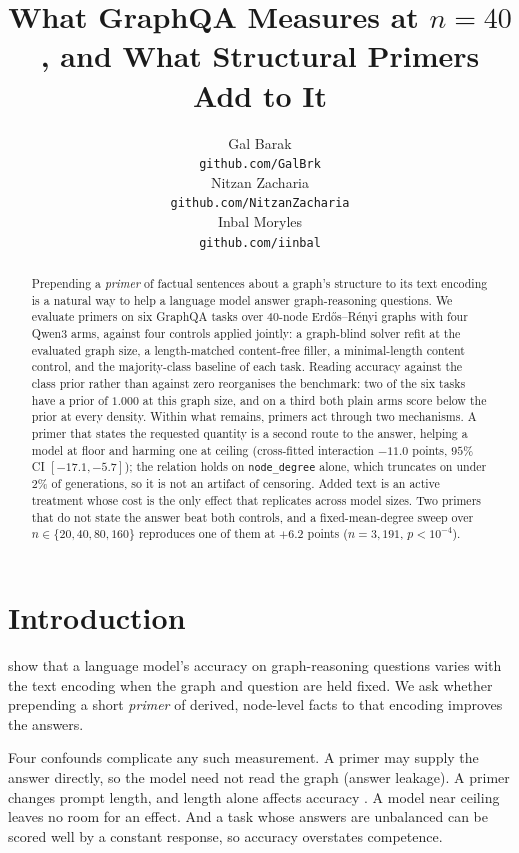 \documentclass[11pt]{article}
\title{What GraphQA Measures at $n{=}40$, and What Structural Primers
Add to It}
\author{
  Gal Barak \\
  \footnotesize\texttt{github.com/GalBrk} \\\And
  Nitzan Zacharia \\
  \footnotesize\texttt{github.com/NitzanZacharia} \\\And
  Inbal Moryles \\
  \footnotesize\texttt{github.com/iinbal} \\
}
\begin{document}
\maketitle

\begin{abstract}
Prepending a \emph{primer} of factual sentences about a graph's structure to
its text encoding is a natural way to help a language model answer
graph-reasoning questions. We evaluate primers on six GraphQA tasks over
$40$-node Erd\H{o}s--R\'enyi graphs with four Qwen3 arms, against four
controls applied jointly: a graph-blind solver refit at the evaluated graph
size, a length-matched content-free filler, a minimal-length content control,
and the majority-class baseline of each task. Reading accuracy against the
class prior rather than against zero reorganises the benchmark: two of the six
tasks have a prior of $1.000$ at this graph size, and on a third both plain
arms score below the prior at every density. Within what remains, primers act
through two mechanisms. A primer that states the requested quantity is a
second route to the answer, helping a model at floor and harming one at
ceiling (cross-fitted interaction $-11.0$ points, $95\%$ CI $[-17.1, -5.7]$);
the relation holds on \texttt{node\_degree} alone, which truncates on under
$2\%$ of generations, so it is not an artifact of censoring. Added text is an
active treatment whose cost is the only effect that replicates across model
sizes. Two primers that do not state the answer beat both controls, and a
fixed-mean-degree sweep over $n\in\{20,40,80,160\}$ reproduces one of them at
$+6.2$ points ($n{=}3{,}191$, $p<10^{-4}$).
\end{abstract}

\section{Introduction}
\label{sec:introduction}

\citet{fatemi2023talklikeagraph} show that a language model's accuracy on
graph-reasoning questions varies with the text encoding when the graph and
question are held fixed. We ask whether prepending a short \emph{primer} of
derived, node-level facts to that encoding improves the answers.

Four confounds complicate any such measurement. A primer may supply the answer
directly, so the model need not read the graph (answer leakage). A primer
changes prompt length, and length alone affects accuracy
\citep{levy2024sametask,liu2024lostinthemiddle}. A model near ceiling leaves no
room for an effect. And a task whose answers are unbalanced can be scored well
by a constant response, so accuracy overstates competence.
\end{document}
